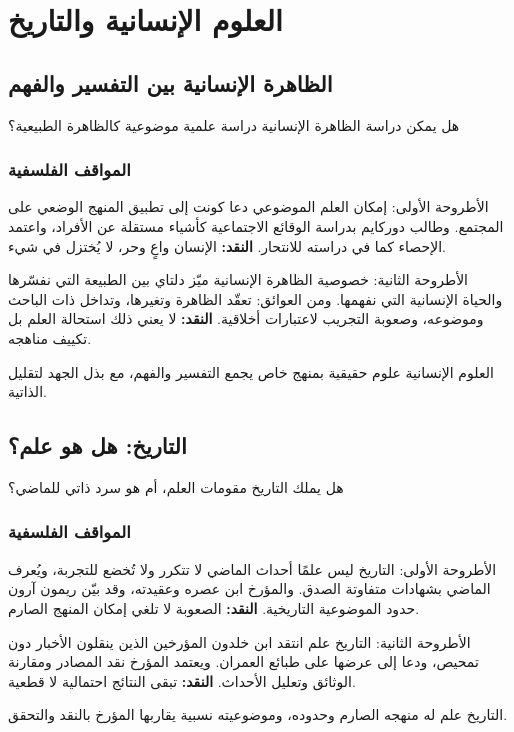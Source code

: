 \documentclass[12pt, twoside, openright]{book}
\begin{document}
\chapter{العلوم الإنسانية والتاريخ}

\section{الظاهرة الإنسانية بين التفسير والفهم}
\begin{problembox}
هل يمكن دراسة الظاهرة الإنسانية دراسة علمية موضوعية كالظاهرة الطبيعية؟
\end{problembox}
\subsection*{المواقف الفلسفية}
\begin{positionbox}{الأطروحة الأولى: إمكان العلم الموضوعي}
دعا كونت إلى تطبيق المنهج الوضعي على المجتمع. وطالب دوركايم بدراسة الوقائع الاجتماعية كأشياء مستقلة عن الأفراد، واعتمد الإحصاء كما في دراسته للانتحار. \textbf{النقد:} الإنسان واعٍ وحر، لا يُختزل في شيء.
\end{positionbox}
\begin{positionbox}{الأطروحة الثانية: خصوصية الظاهرة الإنسانية}
ميّز دلتاي بين الطبيعة التي نفسّرها والحياة الإنسانية التي نفهمها. ومن العوائق: تعقّد الظاهرة وتغيرها، وتداخل ذات الباحث وموضوعه، وصعوبة التجريب لاعتبارات أخلاقية. \textbf{النقد:} لا يعني ذلك استحالة العلم بل تكييف مناهجه.
\end{positionbox}
\begin{synthbox}
العلوم الإنسانية علوم حقيقية بمنهج خاص يجمع التفسير والفهم، مع بذل الجهد لتقليل الذاتية.
\end{synthbox}

\section{التاريخ: هل هو علم؟}
\begin{problembox}
هل يملك التاريخ مقومات العلم، أم هو سرد ذاتي للماضي؟
\end{problembox}
\subsection*{المواقف الفلسفية}
\begin{positionbox}{الأطروحة الأولى: التاريخ ليس علمًا}
أحداث الماضي لا تتكرر ولا تُخضع للتجربة، ويُعرف الماضي بشهادات متفاوتة الصدق. والمؤرخ ابن عصره وعقيدته، وقد بيّن ريمون آرون حدود الموضوعية التاريخية. \textbf{النقد:} الصعوبة لا تلغي إمكان المنهج الصارم.
\end{positionbox}
\begin{positionbox}{الأطروحة الثانية: التاريخ علم}
انتقد ابن خلدون المؤرخين الذين ينقلون الأخبار دون تمحيص، ودعا إلى عرضها على طبائع العمران. ويعتمد المؤرخ نقد المصادر ومقارنة الوثائق وتعليل الأحداث. \textbf{النقد:} تبقى النتائج احتمالية لا قطعية.
\end{positionbox}
\begin{synthbox}
التاريخ علم له منهجه الصارم وحدوده، وموضوعيته نسبية يقاربها المؤرخ بالنقد والتحقق.
\end{synthbox}
\end{document}
